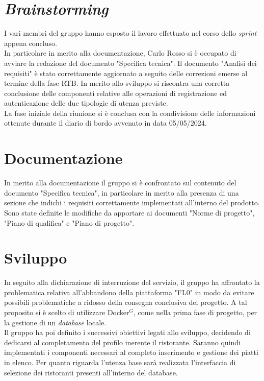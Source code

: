 \section{\textit{Brainstorming}}
I vari membri del gruppo hanno esposto il lavoro effettuato nel corso dello \textit{sprint} appena concluso.\\
In particolare in merito alla documentazione, Carlo Rosso si è occupato di avviare la redazione del documento "Specifica tecnica". 
Il documento "Analisi dei requisiti" è stato correttamente aggiornato a seguito delle correzioni emerse al termine della fase RTB.
In merito allo sviluppo si riscontra una corretta conclusione delle componenti relative alle operazioni di registrazione ed autenticazione delle due tipologie di utenza previste. \\
La fase iniziale della riunione si è conclusa con la condivisione delle informazioni ottenute durante il diario di bordo avvenuto in data 05/05/2024.

\section{Documentazione}
In merito alla documentazione il gruppo si è confrontato sul contenuto del documento "Specifica tecnica", in particolare in merito alla presenza di una sezione che indichi i requisiti correttamente implementati all'interno del prodotto.\\
Sono state definite le modifiche da apportare ai documenti "Norme di progetto", "Piano di qualifica" e "Piano di progetto".

\section{Sviluppo}
In seguito alla dichiarazione di interruzione del servizio, il gruppo ha affrontato la problematica relativa all'abbandono della piattaforma "FL0" in modo da evitare possibili problematiche a ridosso della consegna conclusiva del progetto.
A tal proposito si è scelto di utilizzare Docker$^G$, come nella prima fase di progetto, per la gestione di un \textit{database} locale.\\

Il gruppo ha poi definito i successivi obiettivi legati allo sviluppo, decidendo di dedicarsi al completamento del profilo inerente il ristorante.
Saranno quindi implementati i componenti necessari al completo inserimento e gestione dei piatti in elenco.
Per quanto riguarda l'utenza base sarà realizzata l'interfaccia di selezione dei ristoranti presenti all'interno del database.